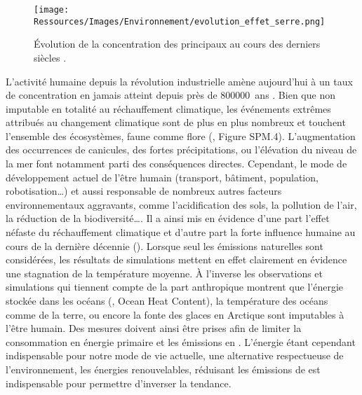 \begin{figure}
    \centering
    \texttt{[image: Ressources/Images/Environnement/evolution\_effet\_serre.png]}
    \caption{Évolution de la concentration des principaux  au cours des
             derniers siècles \parencite{IPCC2014}.}
    \label{fig:evolution_effet_serre}
\end{figure}

L’activité humaine depuis la révolution industrielle amène aujourd’hui à un taux de
concentration en  jamais atteint depuis près de \SI{800000}{ans}
\parencite{IPCC2014}.
Bien que non imputable en totalité au réchauffement climatique, les événements extrêmes
attribués au changement climatique sont de plus en plus nombreux et touchent l’ensemble
des écosystèmes, faune comme flore (\cite{IPCC2014}, Figure SPM.4).
L’augmentation des occurrences de canicules, des fortes précipitations, ou
l’élévation du niveau de la mer font notamment parti des conséquences
directes. Cependant, le mode de développement actuel de l’être humain (transport, bâtiment, population, robotisation\dots)
et aussi responsable de nombreux autres facteurs environnementaux aggravants, comme l’acidification des sols,
la pollution de l’air, la réduction de la biodiversité\dots \parencite{Biermann2016341}.
Il a ainsi mis en évidence d’une part l’effet néfaste du réchauffement climatique
et d’autre part la forte influence humaine au cours de la dernière décennie ().
Lorsque seul les émissions naturelles sont considérées, les résultats de simulations
mettent en effet clairement en évidence une stagnation de la température moyenne. À
l’inverse les observations et simulations qui tiennent compte de la part anthropique
montrent que l’énergie stockée dans les océans (, Ocean Heat Content), la température des océans comme de la
terre, ou encore la fonte des glaces en Arctique sont imputables à l’être humain.
Des mesures doivent ainsi être prises afin de limiter la consommation en énergie primaire
et les émissions en . L’énergie étant cependant indispensable pour notre mode de
vie actuelle, une alternative respectueuse de l’environnement, les énergies renouvelables, réduisant les émissions de
 est indispensable pour permettre d’inverser la tendance.


